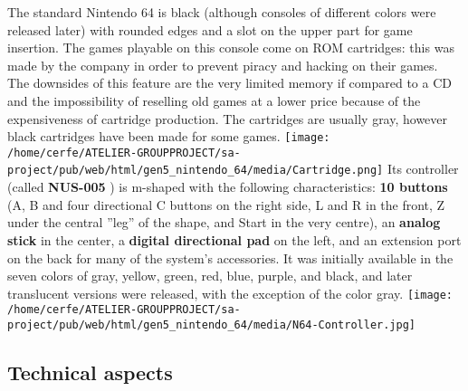 \documentclass[a4paper,10pt]{book}
\begin{document}
          The standard Nintendo 64 is black (although consoles of different colors were released later) with rounded edges and a slot on the upper part for game insertion. The games playable on this console come on ROM cartridges: this was made by the company in order to prevent piracy and hacking on their games. 
          The downsides of this feature are the very limited memory if compared to a CD and the impossibility of reselling old games at a lower price because of the expensiveness of cartridge production. The cartridges are usually gray, however black cartridges have been made for some games. 
 \texttt{[image: /home/cerfe/ATELIER-GROUPPROJECT/sa-project/pub/web/html/gen5\_nintendo\_64/media/Cartridge.png]}
          Its controller (called  \textbf{NUS-005 } ) is m-shaped with the following characteristics:  \textbf{10 buttons }  (A, B and four directional C buttons on the right side, L and R in the front, Z under the central ''leg'' of the shape, and Start in the very centre),
          an  \textbf{analog stick }  in the center, a  \textbf{digital directional pad }  on the left, and an extension port on the back for many of the system's accessories. It was initially available in the seven colors of gray, yellow, green, red, blue, purple, and black, and later translucent versions were released, with the exception of the color gray. 
 \texttt{[image: /home/cerfe/ATELIER-GROUPPROJECT/sa-project/pub/web/html/gen5\_nintendo\_64/media/N64-Controller.jpg]}
 
 \subsection{Technical aspects }
 
\end{document}

